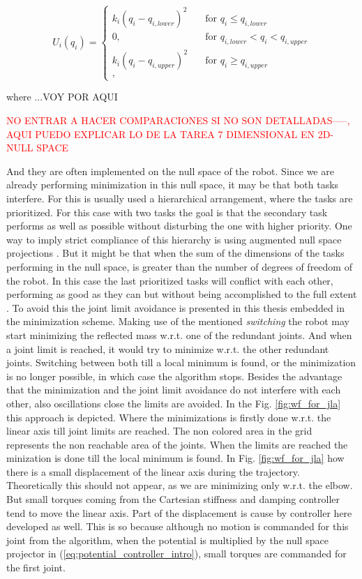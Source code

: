 \begin{equation} 
U_i(q_i) = 
\begin{cases}
k_{i} (q_{i} - q_{i,lower})^{2} &\quad\text{for \ }  q_i\le q_{i,lower}\\
\text{0,} &\quad\text{for \ } q_{i,lower} < q_i < q_{i,upper}\\
k_{i} (q_{i} - q_{i,upper})^{2} &\quad\text{for \ }  q_i\ge q_{i,upper}\\	,
\end{cases}
\label{eq:JLA_dietrich}
\end{equation}


where ...VOY POR AQUI



\textcolor{red}{NO ENTRAR A HACER COMPARACIONES SI NO SON DETALLADAS-----, AQUI PUEDO EXPLICAR LO DE LA TAREA 7 DIMENSIONAL EN 2D-NULL SPACE}

And they are often implemented on the null space of the robot. Since we are already performing minimization in this null space, it may be that both tasks interfere. For this is usually used a hierarchical arrangement, where the tasks are prioritized. For this case with two tasks the goal is that the secondary task performs as well as possible without disturbing the one with higher priority. One way to imply strict compliance of this hierarchy is using augmented null space projections \cite{JLA_5}. But it might be that when the sum of the dimensions of the tasks performing in the null space, is greater than the number of degrees of freedom of the robot. In this case the last prioritized tasks will conflict with each other,  performing as good as they can but without being accomplished to the full extent \cite{JLA_5}.
To avoid this the joint limit avoidance is presented in this thesis embedded in the minimization scheme. Making use of the mentioned \textit{switching} the robot may start minimizing the reflected mass w.r.t. one of the redundant joints. And when a joint limit is reached, it would try to minimize w.r.t. the other redundant joints. Switching between both till a local minimum is found, or the minimization is no longer possible, in which case the algorithm stops.
Besides the advantage that the minimization and the joint limit avoidance do not interfere with each other, also oscillations close the limits are avoided. In the Fig. \ref{fig:wf_for_jla} this approach is depicted. Where the minimizations is firstly done w.r.t. the linear axis till joint limits are reached. The non colored area in the grid represents the non reachable area of the joints. When the limits are reached the minization is done till the local minimum is found. In Fig. \ref{fig:wf_for_jla} how there is a  small displacement of the linear axis during the trajectory. Theoretically this should not appear, as we are minimizing only w.r.t. the elbow. But small torques coming from the Cartesian stiffness and damping controller tend to move the linear axis. Part of the displacement is cause by controller here developed as well. This is so because although no motion is commanded for this joint from the algorithm, when the potential is multiplied by the null space projector in (\ref{eq:potential_controller_intro}), small torques are commanded for the first joint.

